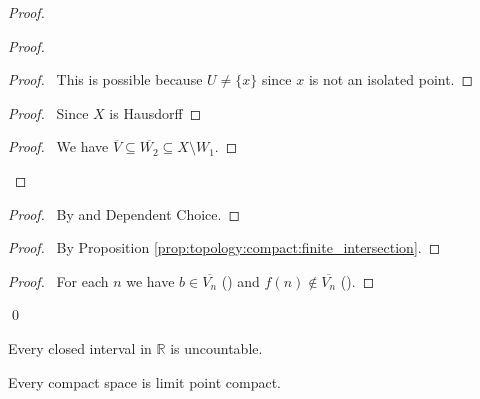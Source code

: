 \begin{proof}
  \pf
  \begin{proof}
    \begin{proof}
      \pf\ This is possible because $U \neq \{ x \}$ since $x$ is not an
      isolated point.
    \end{proof}
    \begin{proof}
      \pf\ Since $X$ is Hausdorff
    \end{proof}
    \begin{proof}
      \pf\ We have $\overline{V} \subseteq \overline{W_2} \subseteq X
      \setminus W_1$.
    \end{proof}
  \end{proof}
  \begin{proof}
    \pf\ By  and Dependent Choice.
  \end{proof}
  \begin{proof}
    \pf\ By Proposition \ref{prop:topology:compact:finite_intersection}.
  \end{proof}
  \begin{proof}
    \pf\ For each $n$ we have $b \in \overline{V_n}$ () and
    $f(n) \notin      \overline{V_n}$ ().
  \end{proof}
  \qed
\end{proof}

\begin{cor}
  Every closed interval in $\mathbb{R}$ is uncountable.
\end{cor}

\begin{thm}
  \label{thm:topology:compact:limit_point_compact}
  Every compact space is limit point compact.
\end{thm}

